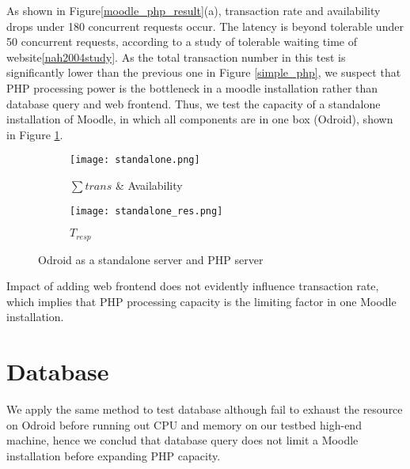 As shown in Figure\ref{moodle_php_result}(a), transaction rate and availability drops under 180 concurrent requests occur. The latency is beyond tolerable under 50 concurrent requests, according to a study of tolerable waiting time of website\ref{nah2004study}. As the total transaction number in this test is significantly lower than the previous one in Figure \ref{simple_php}, we suspect that PHP processing power is the bottleneck in a moodle installation rather than database query and web frontend. Thus, we test the capacity of a standalone installation of Moodle, in which all components are in one box (Odroid), shown in Figure \ref{standalone}.

\begin{figure}[h]
\centering
\begin{subfigure}{0.45\textwidth}
\centering
\texttt{[image: standalone.png]}
\caption{$\sum trans$ \& Availability}
\end{subfigure}
\begin{subfigure}{0.45\textwidth}
\centering
\texttt{[image: standalone\_res.png]}
\caption{$T_{resp}$}
\end{subfigure}
\caption{Odroid as a standalone server and PHP server}
\label{standalone}
\end{figure}

Impact of adding web frontend does not evidently influence transaction rate, which implies that PHP processing capacity is the limiting factor in one Moodle installation.

\section{Database}
We apply the same method to test database although fail to exhaust the resource on Odroid before running out CPU and memory on our testbed high-end machine, hence we conclud that database query does not limit a Moodle installation before expanding PHP capacity.

